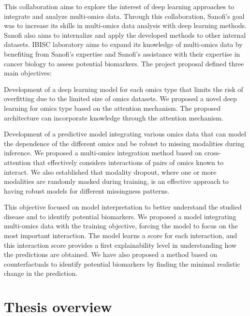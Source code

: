 \documentclass[../main.tex]{subfiles}
\begin{document}
	This collaboration aims to explore the interest of deep learning approaches to integrate and analyze multi-omics data.
	Through this collaboration, Sanofi's goal was to increase its skills in multi-omics data analysis with deep learning methods.
	Sanofi also aims to internalize and apply the developed methods to other internal datasets.
	IBISC laboratory aims to expand its knowledge of multi-omics data by benefiting from Sanofi's expertise and Sanofi's assistance with their expertise in cancer biology to assess potential biomarkers.
	The project proposal defined three main objectives:
	\begin{description}[
			style=multiline,
			leftmargin=!,
			labelwidth=2cm
		]
		\item[First objective]
			Development of a deep learning model for each omics type that limits the risk of overfitting due to the limited size of omics datasets.
			We proposed a novel deep learning for omics type based on the attention mechanism.
			The proposed architecture can incorporate knowledge through the attention mechanism.
		\item[Second objective]
			Development of a predictive model integrating various omics data that can model the dependence of the different omics and be robust to missing modalities during inference.
			We proposed a multi-omics integration method based on cross-attention that effectively considers interactions of pairs of omics known to interact.
			We also established that modality dropout, where one or more modalities are randomly masked during training, is an effective approach to having robust models for different missingness patterns.
		\item[Third objective]
			This objective focused on model interpretation to better understand the studied disease and to identify potential biomarkers.
			We proposed a model integrating multi-omics data with the training objective, forcing the model to focus on the most important interaction.
			The model learns a score for each interaction, and this interaction score provides a first explainability level in understanding how the predictions are obtained.
			We have also proposed a method based on counterfactuals to identify potential biomarkers by finding the minimal realistic change in the prediction.
	\end{description}
	\newpage\enlargethispage{\baselineskip}
\section{Thesis overview}
	\begin{center}
		\vspace{-1\baselineskip}
		\ifSubfilesClassLoaded{%
		}{
		}
	\end{center}

\end{document}
